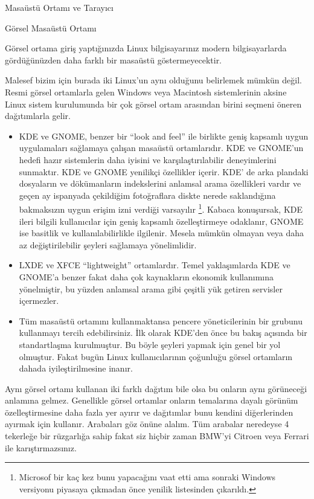\begin{section}{Masaüstü Ortamı ve Tarayıcı}
\begin{subsection}{Görsel Masaüstü Ortamı}

Görsel ortama giriş yaptığınızda Linux bilgisayarınız modern bilgisayarlarda gördüğünüzden daha farklı bir masaüstü göstermeyecektir. 

Malesef bizim için burada iki Linux’un aynı olduğunu belirlemek mümkün değil. Resmi görsel ortamlarla gelen Windows veya Macintosh sistemlerinin aksine Linux sistem kurulumunda bir çok görsel ortam arasından birini seçmeni öneren dağıtımlarla gelir. 
\begin{itemize}
\item KDE ve GNOME, benzer bir “look and feel” ile birlikte geniş kapsamlı uygun uygulamaları sağlamaya çalışan masaüstü ortamlarıdır. KDE ve GNOME’un hedefi hazır sistemlerin daha iyisini ve karşılaştırılabilir deneyimlerini sunmaktır. KDE ve GNOME yenilikçi özellikler içerir. KDE’ de arka plandaki dosyaların ve dökümanların indekslerini anlamsal arama özellikleri vardır ve geçen ay ispanyada çekildiğim fotoğraflara diskte nerede saklandığına bakmaksızın uygun erişim izni verdiği varsayılır
\footnote{Microsof bir kaç kez bunu yapacağını vaat etti ama sonraki Windows versiyonu piyasaya çıkmadan önce yenilik listesinden çıkarıldı.}. Kabaca konuşursak, KDE ileri bilgili kullanıcılar için geniş kapsamlı özelleştirmeye odaklanır, GNOME ise basitlik ve kullanılabilirlikle ilgilenir. Mesela mümkün olmayan veya daha az değiştirilebilir şeyleri sağlamaya yönelimlidir. 
\item LXDE ve XFCE “lightweight” ortamlardır. Temel yaklaşımlarda KDE ve GNOME’a benzer fakat daha çok kaynakların ekonomik kullanımına yönelmiştir, bu yüzden anlamsal arama gibi çeşitli yük getiren servisler içermezler.
\item Tüm masaüstü ortamını kullanmaktansa pencere yöneticilerinin bir grubunu kullanmayı tercih edebilirsiniz. İlk olarak KDE’den önce bu bakış açısında bir standartlaşma kurulmuştur. Bu böyle şeyleri yapmak için genel bir yol olmuştur. Fakat bugün Linux kullanıcılarının çoğunluğu görsel ortamların  dahada iyileştirilmesine inanır. 
\end{itemize}

Aynı görsel ortamı kullanan iki farklı dağıtım bile olsa bu onların aynı görüneceği anlamına gelmez. Genellikle görsel ortamlar onların temalarına dayalı görünüm özelleştirmesine daha fazla yer ayırır ve dağıtımlar bunu kendini diğerlerinden ayırmak için kullanır. Arabaları göz önüne alalım. Tüm arabalar neredeyse 4 tekerleğe bir rüzgarlığa sahip fakat siz hiçbir zaman BMW’yi Citroen veya Ferrari ile karıştırmazsınız. 


\end{subsection}
\end{section}

